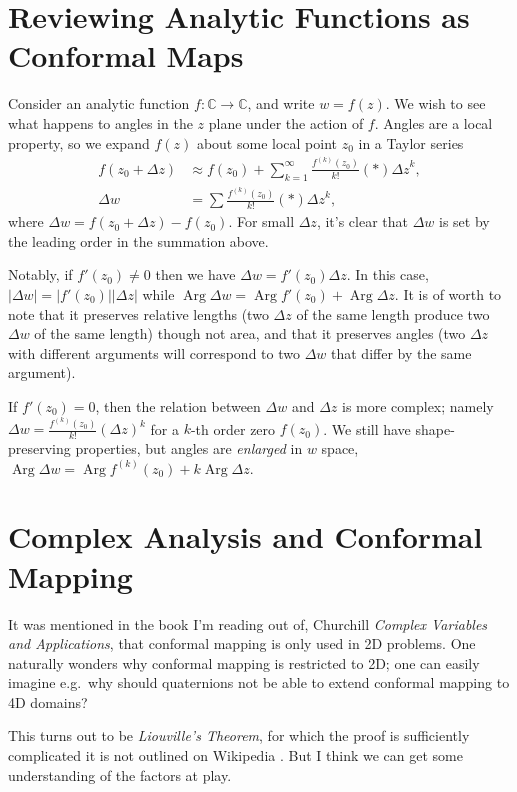 \documentclass[12pt]{report}
\newcommand*{\abs}[1]{\left|#1\right|}
\newcommand*{\p}[1]{\left(#1\right)}
\DeclareMathOperator{\Arg}{Arg}
\begin{document}
\section{Reviewing Analytic Functions as Conformal Maps}

Consider an analytic function $f: \mathbb{C} \to \mathbb{C}$, and write $w =
f(z)$. We wish to see what happens to angles in the $z$ plane under the action
of $f$. Angles are a local property, so we expand $f(z)$ about some local point
$z_0$ in a Taylor series
\begin{align}
    f(z_0 + \Delta z) &\approx f(z_0) + \sum\limits_{k=1}^\infty
        \frac{f^{(k)}(z_0)}{k!}\p*{\Delta z}^k,\\
    \Delta w &= \sum\limits \frac{f^{(k)}(z_0)}{k!}\p*{\Delta z}^k,
\end{align}
where $\Delta w = f(z_0 + \Delta z) - f(z_0)$. For small $\Delta z$, it's clear
that $\Delta w$ is set by the leading order in the summation above.

Notably, if $f'(z_0) \neq 0$ then we have $\Delta w = f'(z_0) \Delta z$. In this
case, $\abs{\Delta w} = \abs{f'(z_0)}\abs{\Delta z}$ while $\Arg \Delta w = \Arg
f'(z_0) + \Arg \Delta z$. It is of worth to note that it preserves relative
lengths (two $\Delta z$ of the same length produce two $\Delta w$ of the same
length) though not area, and that it preserves angles (two $\Delta z$ with
different arguments will correspond to two $\Delta w$ that differ by the same
argument).

If $f'(z_0) = 0$, then the relation between $\Delta w$ and $\Delta z$ is more
complex; namely $\Delta w = \frac{f^{(k)}(z_0)}{k!} (\Delta z)^k$ for a $k$-th order
zero $f(z_0)$. We still have shape-preserving properties, but angles are
\emph{enlarged} in $w$ space, $\Arg \Delta w = \Arg f^{(k)}(z_0) + k \Arg \Delta
z$.

\section{Complex Analysis and Conformal Mapping}

It was mentioned in the book I'm reading out of, Churchill \emph{Complex
Variables and Applications}, that conformal mapping is only used in 2D problems.
One naturally wonders why conformal mapping is restricted to 2D\@; one can
easily imagine e.g.\ why should quaternions not be able to extend conformal
mapping to 4D domains?

This turns out to be \emph{Liouville's Theorem}, for which the proof is
sufficiently complicated it is not outlined on Wikipedia \frownie. But I think
we can get some understanding of the factors at play.
\end{document}
